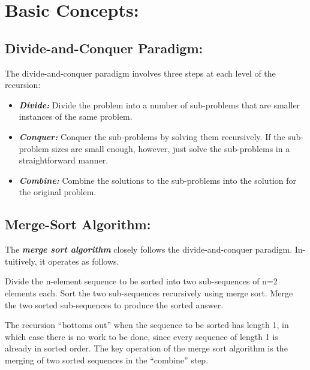 \section{Basic Concepts:}

\subsection{Divide-and-Conquer Paradigm:}

The divide-and-conquer paradigm involves three steps at each level of the recursion:

\begin{itemize}
\item {\bfseries\itshape Divide:} Divide the problem into a number of sub-problems that are smaller instances of the same problem.
\item {\bfseries\itshape Conquer:} Conquer the sub-problems by solving them recursively. If the sub-problem sizes are small enough, however, just solve the sub-problems in a straightforward manner.
\item {\bfseries\itshape Combine:} Combine the solutions to the sub-problems into the solution for the original problem.
\end{itemize}

\subsection{Merge-Sort Algorithm:}

The {\bfseries\itshape merge sort algorithm} closely follows the divide-and-conquer paradigm. In- tuitively, it operates as follows.

\begin{tasks}
 Divide the n-element sequence to be sorted into two sub-sequences of n=2 elements each.
 Sort the two sub-sequences recursively using merge sort.
 Merge the two sorted sub-sequences to produce the sorted answer.
\end{tasks}

The recursion “bottoms out” when the sequence to be sorted has length 1, in which case there is no work to be done, since every sequence of length 1 is already in sorted order. The key operation of the merge sort algorithm is the merging of two sorted sequences in the “combine” step. 

\pagebreak